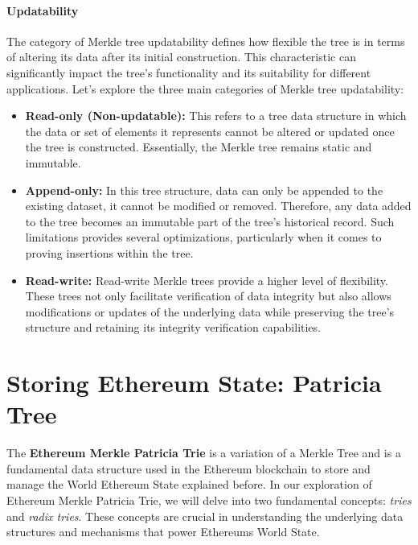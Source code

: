 \paragraph*{Updatability}

The category of Merkle tree updatability defines how flexible the tree is in terms of altering its data after its initial construction. This characteristic can significantly impact the tree's functionality and its suitability for different applications. Let's explore the three main categories of Merkle tree updatability:

\begin{itemize}

\item \textbf{Read-only (Non-updatable):} This refers to a tree data structure in which the data or set of elements it represents cannot be altered or updated once the tree is constructed. Essentially, the Merkle tree remains static and immutable.

\item \textbf{Append-only:} In this tree structure, data can only be appended to the existing dataset, it cannot be modified or removed. Therefore, any data added to the tree becomes an immutable part of the tree's historical record. Such limitations provides several optimizations, particularly when it comes to proving insertions within the tree.

\item \textbf{Read-write:} Read-write Merkle trees provide a higher level of flexibility. These trees not only facilitate verification of data integrity but also allows modifications or updates of the underlying data while preserving the tree's structure and retaining its integrity verification capabilities.

\end{itemize}



\section{Storing Ethereum State: Patricia Tree} \label{sec:ethereum-patricia-trie}

The \textbf{Ethereum Merkle Patricia Trie} is a variation of a Merkle Tree and is a fundamental data structure used in the Ethereum blockchain to store and manage the World Ethereum State explained before. In our exploration of Ethereum Merkle Patricia Trie, we will delve into two fundamental concepts: \textit{tries} and \textit{radix tries}. These concepts are crucial in understanding the underlying data structures and mechanisms that power Ethereums World State.

